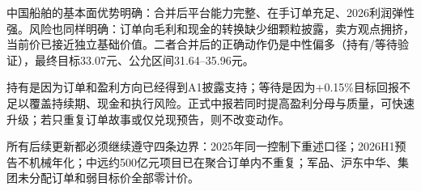 中国船舶的基本面优势明确：合并后平台能力完整、在手订单充足、2026利润弹性强。风险也同样明确：订单向毛利和现金的转换缺少细颗粒披露，卖方观点拥挤，当前价已接近独立基础价值。二者合并后的正确动作仍是中性偏多（持有/等待验证），最终目标33.07元、公允区间31.64--35.96元。

\begin{keyinsight}
持有是因为订单和盈利方向已经得到A1披露支持；等待是因为+0.15\%目标回报不足以覆盖持续期、现金和执行风险。正式中报若同时提高盈利分母与质量，可快速升级；若只重复订单故事或仅兑现预告，则不改变动作。
\end{keyinsight}

所有后续更新都必须继续遵守四条边界：2025年同一控制下重述口径；2026H1预告不机械年化；中远约500亿元项目已在聚合订单内不重复；军品、沪东中华、集团未分配订单和弱目标价全部零计价。

